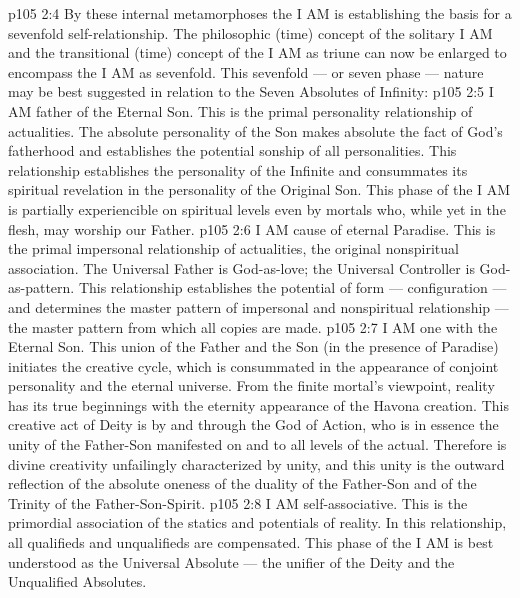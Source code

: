 \vs p105 2:4 By these internal metamorphoses the I AM is establishing the basis for a sevenfold self\hyp{}relationship. The philosophic (time) concept of the solitary I AM and the transitional (time) concept of the I AM as triune can now be enlarged to encompass the I AM as sevenfold. This sevenfold --- or seven phase --- nature may be best suggested in relation to the Seven Absolutes of Infinity:
\vs p105 2:5 \bibnobreakspace {} I AM father of the Eternal Son. This is the primal personality relationship of actualities. The absolute personality of the Son makes absolute the fact of God’s fatherhood and establishes the potential sonship of all personalities. This relationship establishes the personality of the Infinite and consummates its spiritual revelation in the personality of the Original Son. This phase of the I AM is partially experiencible on spiritual levels even by mortals who, while yet in the flesh, may worship our Father.
\vs p105 2:6 \bibnobreakspace {} I AM cause of eternal Paradise. This is the primal impersonal relationship of actualities, the original nonspiritual association. The Universal Father is God\hyp{}as\hyp{}love; the Universal Controller is God\hyp{}as\hyp{}pattern. This relationship establishes the potential of form --- configuration --- and determines the master pattern of impersonal and nonspiritual relationship --- the master pattern from which all copies are made.
\vs p105 2:7 \bibnobreakspace {} I AM one with the Eternal Son. This union of the Father and the Son (in the presence of Paradise) initiates the creative cycle, which is consummated in the appearance of conjoint personality and the eternal universe. From the finite mortal’s viewpoint, reality has its true beginnings with the eternity appearance of the Havona creation. This creative act of Deity is by and through the God of Action, who is in essence the unity of the Father\hyp{}Son manifested on and to all levels of the actual. Therefore is divine creativity unfailingly characterized by unity, and this unity is the outward reflection of the absolute oneness of the duality of the Father\hyp{}Son and of the Trinity of the Father\hyp{}Son\hyp{}Spirit.
\vs p105 2:8 \bibnobreakspace {} I AM self\hyp{}associative. This is the primordial association of the statics and potentials of reality. In this relationship, all qualifieds and unqualifieds are compensated. This phase of the I AM is best understood as the Universal Absolute --- the unifier of the Deity and the Unqualified Absolutes.
